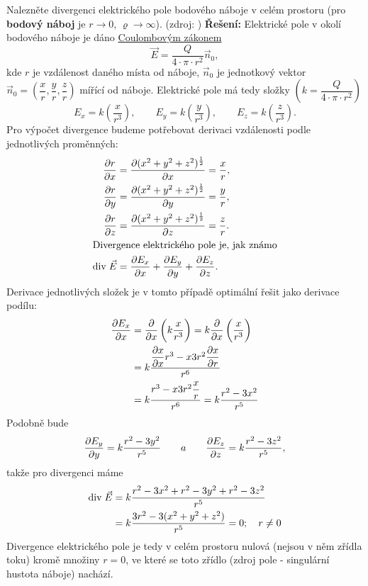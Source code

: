 \begin{mdframed}[style=mdexam]
\begin{example}
  Nalezněte divergenci elektrického pole bodového náboje v celém prostoru (pro 
  \textbf{bodový náboj} je \(r\rightarrow0\), \(\varrho\rightarrow\infty\)).
  (zdroj: \librariaALDBR)\newline  
  \textbf{Řešení:}
  Elektrické pole v okolí bodového náboje je dáno \hyperlink{fyz:IIchapIVsecII}{Coulombovým zákonem}
  \[\vec{E} = \frac{Q}{4\cdot\pi\cdot r^2}\vec{n}_0,\] kde \(r\) je vzdálenost daného místa od
  náboje, \(\vec{n}_0\) je jednotkový vektor \(\vec{n}_0 = \left(\dfrac{x}{r}, \dfrac{y}{r},
  \dfrac{z}{r}\right)\) mířící od náboje. Elektrické pole má tedy složky \(\left(k =
  \dfrac{Q}{4\cdot\pi\cdot r^2}\right)\)
  \begin{equation*}
    E_x = k\left(\frac{x}{r^3}\right), \qquad
    E_y = k\left(\frac{y}{r^3}\right), \qquad
    E_z = k\left(\frac{z}{r^3}\right).
  \end{equation*}
  Pro výpočet divergence budeme potřebovat derivaci vzdálenosti podle jednotlivých
  proměnných:
  \begin{align*}
    \dfrac{\partial r}{\partial x} &= \dfrac{\partial (x^2 + y^2 + z^2)^\frac{1}{2}}{\partial x} = \frac{x}{r},  \\
    \dfrac{\partial r}{\partial y} &= \dfrac{\partial (x^2 + y^2 + z^2)^\frac{1}{2}}{\partial y} = \frac{y}{r},  \\ 
    \dfrac{\partial r}{\partial z} &= \dfrac{\partial (x^2 + y^2 + z^2)^\frac{1}{2}}{\partial z} = \frac{z}{r}.  \\
    \shortintertext{Divergence elektrického pole je, jak známo}            
    \mathrm{div}\;\vec{E}   &= \dfrac{\partial E_x}{\partial x} + \dfrac{\partial E_y}{\partial y} + \dfrac{\partial E_z}{\partial z}.
  \end{align*}
  Derivace jednotlivých složek je v tomto případě optimální řešit jako derivace podílu:
  \begin{align*}
    \dfrac{\partial E_x}{\partial x}  &=  \dfrac{\partial  }{\partial x}\left(k\dfrac{x}{r^3}\right)         
                    = k\dfrac{\partial  }{\partial x}\left(\dfrac{x}{r^3}\right)                \\ 
                   &= k\dfrac{\dfrac{\partial x}{\partial x}r^3-x3r^2\dfrac{\partial x}{\partial r}}{r^6}          \\
                   &= k\dfrac{r^3-x3r^2\dfrac{x}{r}}{r^6}
                    = k\dfrac{r^2-3x^2}{r^5}
  \end{align*}
  Podobně bude
  \begin{equation*}
    \dfrac{\partial E_y}{\partial y} = k\dfrac{r^2-3y^2}{r^5} \qquad a \qquad
    \dfrac{\partial E_z}{\partial z} = k\dfrac{r^2-3z^2}{r^5},
  \end{equation*}
  takže pro divergenci máme
  \begin{align*}
    \mathrm{div}\;\vec{E} &= k\dfrac{r^2 - 3x^2 + r^2 - 3y^2 + r^2 - 3z^2}{r^5}       \\
              &= k\dfrac{3r^2-3(x^2 + y^2 + z^2)}{r^5} = 0; \quad r\neq0
  \end{align*}
  Divergence elektrického pole je tedy v celém prostoru nulová (nejsou v něm zřídla toku) kromě 
  množiny \(r = 0\), ve které se toto zřídlo (zdroj pole - singulární hustota náboje) nachází.
\end{example}
\end{mdframed}